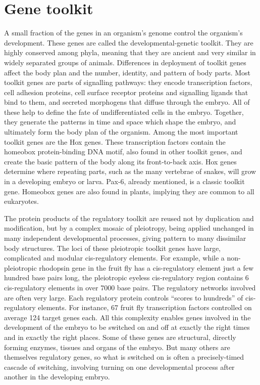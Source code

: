 \hypertarget{gene-toolkit}{%
\section{Gene toolkit}\label{gene-toolkit}}

A small fraction of the genes in an organism's genome control the organism's development. These genes are called the developmental-genetic toolkit. They are highly conserved among phyla, meaning that they are ancient and very similar in widely separated groups of animals. Differences in deployment of toolkit genes affect the body plan and the number, identity, and pattern of body parts. Most toolkit genes are parts of signalling pathways: they encode transcription factors, cell adhesion proteins, cell surface receptor proteins and signalling ligands that bind to them, and secreted morphogens that diffuse through the embryo. All of these help to define the fate of undifferentiated cells in the embryo. Together, they generate the patterns in time and space which shape the embryo, and ultimately form the body plan of the organism. Among the most important toolkit genes are the Hox genes. These transcription factors contain the homeobox protein-binding DNA motif, also found in other toolkit genes, and create the basic pattern of the body along its front-to-back axis. Hox genes determine where repeating parts, such as the many vertebrae of snakes, will grow in a developing embryo or larva. Pax-6, already mentioned, is a classic toolkit gene. Homeobox genes are also found in plants, implying they are common to all eukaryotes.

The protein products of the regulatory toolkit are reused not by duplication and modification, but by a complex mosaic of pleiotropy, being applied unchanged in many independent developmental processes, giving pattern to many dissimilar body structures. The loci of these pleiotropic toolkit genes have large, complicated and modular cis-regulatory elements. For example, while a non-pleiotropic rhodopsin gene in the fruit fly has a cis-regulatory element just a few hundred base pairs long, the pleiotropic eyeless cis-regulatory region contains 6 cis-regulatory elements in over 7000 base pairs. The regulatory networks involved are often very large. Each regulatory protein controls ``scores to hundreds'' of cis-regulatory elements. For instance, 67 fruit fly transcription factors controlled on average 124 target genes each. All this complexity enables genes involved in the development of the embryo to be switched on and off at exactly the right times and in exactly the right places. Some of these genes are structural, directly forming enzymes, tissues and organs of the embryo. But many others are themselves regulatory genes, so what is switched on is often a precisely-timed cascade of switching, involving turning on one developmental process after another in the developing embryo.


